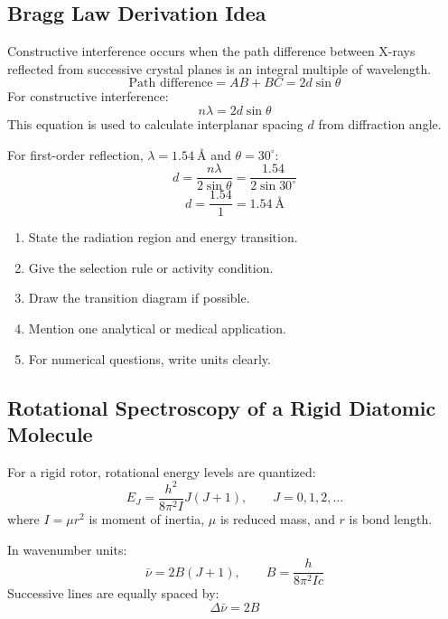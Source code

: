\documentclass[12pt,a4paper]{article}
\begin{document}
\subsection{Bragg Law Derivation Idea}
Constructive interference occurs when the path difference between X-rays reflected from successive crystal planes is an integral multiple of wavelength.
\[
\text{Path difference}=AB+BC=2d\sin\theta
\]
For constructive interference:
\[
n\lambda=2d\sin\theta
\]
This equation is used to calculate interplanar spacing $d$ from diffraction angle.

\begin{tcolorbox}[examplebox, title={Solved Example: Crystal Plane Spacing}]
For first-order reflection, $\lambda=1.54\ \text{\AA}$ and $\theta=30^\circ$:
\[
d=\frac{n\lambda}{2\sin\theta}=\frac{1.54}{2\sin30^\circ}
\]
\[
d=\frac{1.54}{1}=1.54\ \text{\AA}
\]
\end{tcolorbox}

\begin{tcolorbox}[masonbox, title={Answer-Writing Pattern for Spectroscopy}]
\begin{enumerate}[leftmargin=*, itemsep=3pt, topsep=2pt]
  \item State the radiation region and energy transition.
  \item Give the selection rule or activity condition.
  \item Draw the transition diagram if possible.
  \item Mention one analytical or medical application.
  \item For numerical questions, write units clearly.
\end{enumerate}
\end{tcolorbox}

\subsection{Rotational Spectroscopy of a Rigid Diatomic Molecule}
For a rigid rotor, rotational energy levels are quantized:
\[
E_J=\frac{h^2}{8\pi^2I}J(J+1),\qquad J=0,1,2,\ldots
\]
where $I=\mu r^2$ is moment of inertia, $\mu$ is reduced mass, and $r$ is bond length.

\begin{tcolorbox}[formulabox, title={Rotational Spectral Lines}]
In wavenumber units:
\[
\bar{\nu}=2B(J+1),\qquad B=\frac{h}{8\pi^2Ic}
\]
Successive lines are equally spaced by:
\[
\Delta\bar{\nu}=2B
\]
\end{tcolorbox}
\end{document}
